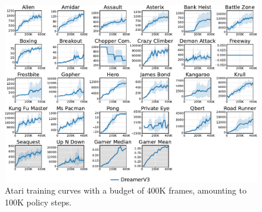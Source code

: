 \begin{figure}[h!]
\begin{adjustwidth}{-1em}{-1em}
\centering
\includegraphics[width=\linewidth]{atari100k/atari100k}
\end{adjustwidth}
\caption{Atari training curves with a budget of 400K frames, amounting to 100K policy steps.}
\label{fig:atari100k}
\end{figure}